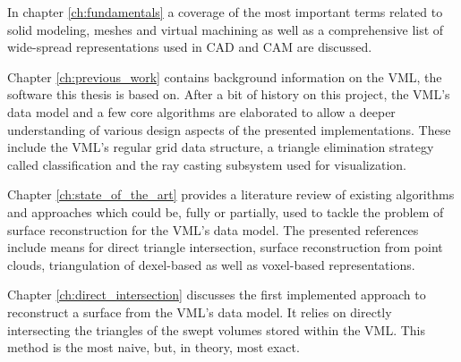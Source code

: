 In chapter \ref{ch:fundamentals} a coverage of the most important terms related to solid modeling, meshes and virtual machining as well as a comprehensive list of wide-spread representations used in CAD and CAM are discussed.

Chapter \ref{ch:previous_work} contains background information on the VML, the software this thesis is based on.
After a bit of history on this project, the VML's data model and a few core algorithms are elaborated to allow a deeper understanding of various design aspects of the presented implementations. These include the VML's regular grid data structure, a triangle elimination strategy called classification and the ray casting subsystem used for visualization.

Chapter \ref{ch:state_of_the_art} provides a literature review of existing algorithms and approaches which could be, fully or partially, used to tackle the problem of surface reconstruction for the VML's data model.
The presented references include means for direct triangle intersection, surface reconstruction from point clouds, triangulation of dexel-based as well as voxel-based representations.

Chapter \ref{ch:direct_intersection} discusses the first implemented approach to reconstruct a surface from the VML's data model.
It relies on directly intersecting the triangles of the swept volumes stored within the VML.
This method is the most naive, but, in theory, most exact.

